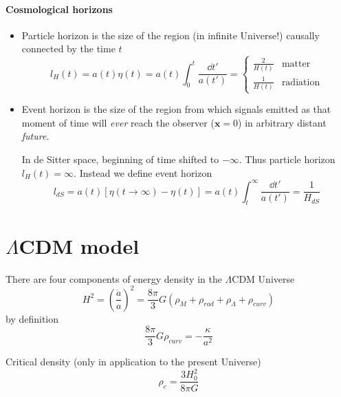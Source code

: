 \documentclass[12pt, a4paper, DIV=15]{article}
\numberwithin{equation}{section}
\begin{document}
\paragraph{Cosmological horizons}
\begin{itemize}
   \item Particle horizon is the size of the region (in infinite Universe!) causally connected by the time $t$
      \begin{equation}
         l_H(t) = a(t) \eta (t) = a(t) \int_0^t \frac{\dd{t'}}{a(t')} =
         \begin{cases}
            \frac{2}{H(t)} & \text{matter} \\
            \frac{1}{H(t)} & \text{radiation}
         \end{cases}
      \end{equation}
   \item Event horizon is the size of the region from which signals emitted as that moment of time will \textit{ever} reach the observer ($\pmb{x} = 0$) in arbitrary distant \textit{future}.

      In de Sitter space, beginning of time shifted to $-\infty$. Thus particle horizon $l_H(t) = \infty$. Instead we define event horizon
      \begin{equation}
         l_{dS} = a(t) \left[ \eta(t\rightarrow \infty) - \eta(t) \right]  = a(t) \int_t^\infty \frac{\dd{t'}}{a(t')} = \frac{1}{H_{dS}}
      \end{equation}
\end{itemize}

\section{$\Lambda$CDM model}
There are four components of energy density in the $\Lambda$CDM Universe
\begin{equation}
   H^2 = \left( \frac{\dot{a}}{a} \right)^2 = \frac{8\pi}{3} G \left( \rho_M + \rho_{rad} + \rho_\Lambda + \rho_{curv} \right)
\end{equation}
by definition
\begin{equation}
   \frac{8 \pi}{3} G \rho_{curv} = - \frac{\kappa}{a^2}
\end{equation}

Critical density (only in application to the present Universe)
\begin{equation}
   \rho_c = \frac{3 H_0^2}{8\pi G}
\end{equation}
\end{document}

